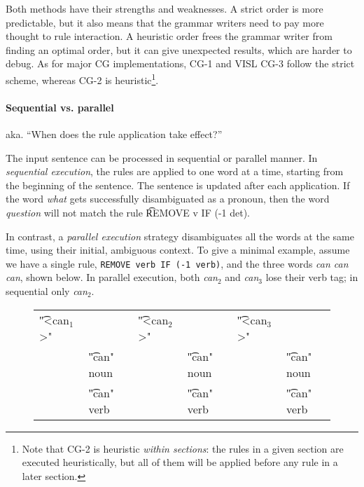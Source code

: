 Both methods have their strengths and weaknesses. A strict order is more predictable, but it also means that the grammar writers need to pay more thought to rule interaction. A heuristic order frees the grammar writer from finding an optimal order, but it can give unexpected results, which are harder to debug.
As for major CG implementations, CG-1 \cite{karlsson1990cgp} and VISL CG-3 \cite{vislcg3} follow the strict scheme, whereas CG-2 \cite{tapanainen1996} is heuristic\footnote{Note that CG-2 is heuristic \emph{within sections}: the rules in a given section are executed heuristically, but all of them will be applied before any rule in a later section.}.





\paragraph{Sequential vs. parallel}

aka. ``When does the rule application take effect?''

The input sentence can be processed in sequential or parallel manner.
In \emph{sequential execution}, the rules are applied to one word at a time, starting from the beginning of the sentence. The sentence is updated after each application. If the word \emph{what} gets successfully disambiguated as a pronoun, then the word \emph{question} will not match the rule \t{REMOVE v IF (-1 det)}.


In contrast, a \emph{parallel execution} strategy disambiguates all the words at the same 
time, using their initial, ambiguous context. 
To give a minimal example, assume we have a single rule, \texttt{REMOVE verb IF (-1 verb)}, and the three words \emph{can can can}, shown below. 
In parallel execution, both \emph{can$_2$} and \emph{can$_3$} lose their verb tag; in sequential only \emph{can$_2$}.


\begin{figure}[h]
\begin{tabular}{p{0.5cm} l   p{0.5cm} l    p{0.5cm} l}
\t{"<can$_1$>"}      &  & \t{"<can$_2$>"}  & & \t{"<can$_3$>"} & \\
   & \t{"can" noun}  &  & \t{"can" noun} & & \t{"can" noun}   \\
   & \t{"can" verb}  &  & \t{"can" verb} & & \t{"can" verb} 

\end{tabular}
\end{figure}

